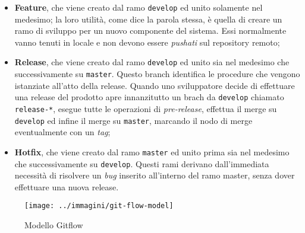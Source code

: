 \begin{itemize}

\item \textbf{Feature}, che viene creato dal ramo \texttt{develop} ed unito solamente nel medesimo; la loro utilità, come dice la parola stessa, è quella di creare un ramo di sviluppo per un nuovo componente del sistema. Essi normalmente vanno tenuti in locale e non devono essere \textit{pushati} sul repository remoto;

\item \textbf{Release}, che viene creato dal ramo \texttt{develop} ed unito sia nel medesimo che successivamente su \texttt{master}. Questo branch identifica le procedure che vengono istanziate all'atto della release. Quando uno sviluppatore decide di effettuare una release del prodotto apre innanzitutto un brach da \texttt{develop} chiamato \texttt{release-*}, esegue tutte le operazioni di \textit{pre-release}, effettua il merge su \texttt{develop} ed infine il merge su \texttt{master}, marcando il nodo di merge eventualmente con un \textit{tag};

\item \textbf{Hotfix}, che viene creato dal ramo \texttt{master} ed unito prima sia nel medesimo che successivamente su \texttt{develop}. Questi rami derivano dall'immediata necessità di risolvere un \textit{bug} inserito all'interno del ramo master, senza dover effettuare una nuova release. 

\end{itemize}

\begin{figure}[htp]
\centering
\texttt{[image: ../immagini/git-flow-model]}
\caption{Modello Gitflow}
\end{figure}


